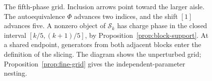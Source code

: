 \begin{figure}[tbp]
\centering
{}
\caption{The fifth-phase grid. Inclusion arrows point toward the larger
aisle. The autoequivalence $\Phi$ advances two indices, and the shift $[1]$
advances five. A nonzero object of $\mathcal S_k$ has charge phase in the
closed interval $[k/5,(k+1)/5]$, by Proposition~\ref{prop:block-support}.
At a shared endpoint, generators from both adjacent blocks enter the
definition of the slicing. The diagram shows the unperturbed grid;
Proposition~\ref{prop:fine-grid} gives the independent-parameter nesting.}
\label{fig:fifth-phase-grid}
\end{figure}
